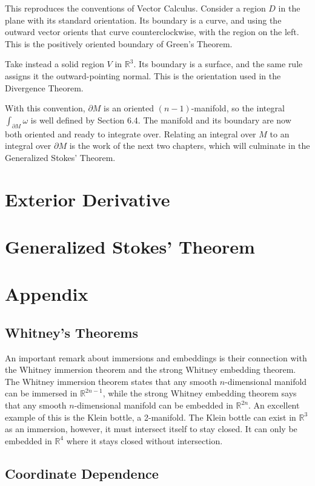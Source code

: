 \documentclass[12pt]{article}
\newcommand{\R}{\mathbb{R}}
\newcommand{\p}{\partial}
\begin{document}
This reproduces the conventions of Vector Calculus. Consider a region $D$ in the plane with its standard orientation. Its boundary is a curve, and using the outward vector orients that curve counterclockwise, with the region on the left. This is the positively oriented boundary of Green's Theorem.

Take instead a solid region $V$ in $\R^3$. Its boundary is a surface, and the same rule assigns it the outward-pointing normal. This is the orientation used in the Divergence Theorem.

With this convention, $\p M$ is an oriented $(n-1)$-manifold, so the integral $\int_{\p M} \omega$ is well defined by Section 6.4. The manifold and its boundary are now both oriented and ready to integrate over. Relating an integral over $M$ to an integral over $\p M$ is the work of the next two chapters, which will culminate in the Generalized Stokes' Theorem.

\section{Exterior Derivative}
\section{Generalized Stokes' Theorem}

\section{Appendix}

\subsection{Whitney's Theorems}

An important remark about immersions and embeddings is their connection with the Whitney immersion theorem and the strong Whitney embedding theorem. The Whitney immersion theorem states that any smooth $n$-dimensional manifold can be immersed in $\R^{2n-1}$, while the strong Whitney embedding theorem says that any smooth $n$-dimensional manifold can be embedded in $\R^{2n}$. An excellent example of this is the Klein bottle, a 2-manifold. The Klein bottle can exist in $\R^3$ as an immersion, however, it must intersect itself to stay closed. It can only be embedded in $\R^4$ where it stays closed without intersection.

\subsection{Coordinate Dependence}
\end{document}
